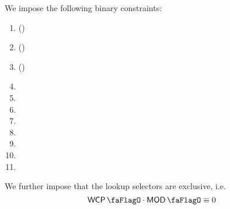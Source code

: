 We impose the following binary constraints:
\begin{multicols}{3}
	\begin{enumerate}
		\item \existence{} (\trash)
		\item \warm{} (\trash)
		\item \oogx{} (\trash)
		\item \wcpLookupFlag{}
		\item \divLookupFlag{}
		\item \stpCreate{}
		\item \stpCreateTwo{}
		\item \stpCall{}
		\item \stpCallCode{}
		\item \stpDelegateCall{}
		\item \stpStaticCall{}
	\end{enumerate}
\end{multicols}
We further impose that the lookup selectors are exclusive, i.e.
\[ \wcpLookupFlag \cdot \divLookupFlag \equiv 0 \]

